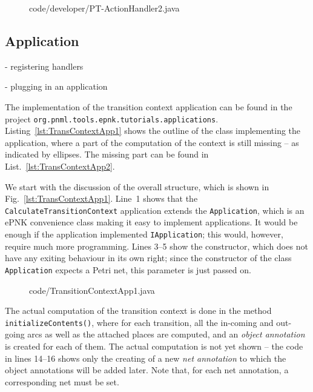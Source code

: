 \begin{figure}[htbp!]
%
  {code/developer/PT-ActionHandler2.java}
\end{figure}



\subsection{Application}
\label{subsec:developer:applications:application}

- registering handlers

- plugging in an application


The implementation of the transition context application can be found
in the project {\tt org.pnml.tools.epnk.tutorials.applications}.
Listing~\ref{lst:TransContextApp1} shows the outline of the class implementing
the application, where a part of the computation of the context is still missing
-- as indicated by ellipses. The missing part can be found in
List.~\ref{lst:TransContextApp2}.

We start with the discussion of the overall structure, which is shown in
Fig.~\ref{lst:TransContextApp1}. Line~1 shows that the {\tt CalculateTransitionContext}
application extends the {\tt Application}, which is an ePNK convenience class
making it easy to implement applications. It would be enough if the application
implemented {\tt IApplication}; this would, however, require much more programming.
Lines 3--5 show the constructor, which does not have any exiting behaviour in
its own right; since the constructor of the class {\tt Application} expects a
Petri net, this parameter is just passed on.

\begin{figure}[htbp!]
%
  {code/TransitionContextApp1.java}
\end{figure}

%
%
The actual computation of the transition context is done in the method
{\tt initializeContents()}, where for each transition, all the in-coming
and out-going arcs as well as the attached places are computed, and
an \emph{object annotation} is created for each of them. The actual computation
is not yet shown -- the code in lines 14--16 shows only the creating of a 
new \emph{net annotation} to which the object annotations will be added later.
Note that, for each net annotation, a corresponding net must be set. 

